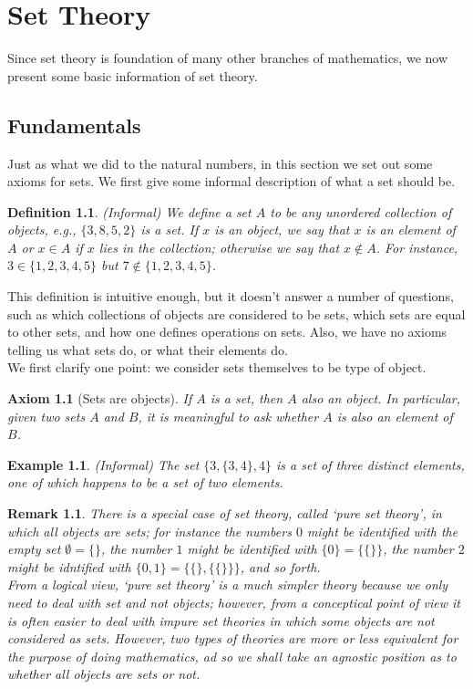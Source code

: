 \documentclass[a4paper]{book}
\newtheorem{definition}{Definition}[section]
\newtheorem{axiom}{Axiom}[chapter]
\newtheorem{example}{Example}[section]
\newtheorem{remark}{Remark}[section]
\begin{document}
	\chapter{Set Theory}
	Since set theory is foundation of many other branches of mathematics, we now present some basic information of set theory.
		\section{Fundamentals}
			Just as what we did to the natural numbers, in this section we set out some axioms for sets. We first give some informal description of what a set should be.
			\begin{definition}
				(Informal) We define a set $A$ to be any unordered collection of objects, e.g., $\{3,8,5,2\}$ is a set. If $x$ is an object, we say that $x$ is an element of $A$ or $x\in A$ if $x$ lies in the collection; otherwise we say that $x\notin A$. For instance, $3\in \{1,2,3,4,5\}$ but $7\notin \{1,2,3,4,5\}$.
			\end{definition}
			This definition is intuitive enough, but it doesn't answer a number of questions, such as which collections of objects are considered to be sets, which sets are equal to other sets, and how one defines operations on sets. Also, we have no axioms telling us what sets do, or what their elements do.\\
			We first clarify one point: we consider sets themselves to be type of object.
			\begin{axiom}[Sets are objects]
				If $A$ is a set, then $A$ also an object. In particular, given two sets $A$ and $B$, it is meaningful to ask whether $A$ is also an element of $B$.
			\end{axiom}
			\begin{example}
				(Informal) The set $\{3,\{3,4\},4\}$ is a set of three distinct elements, one of which happens to be a set of two elements.
			\end{example}
			\begin{remark}
				There is a special case of set theory, called `pure set theory', in which \textit{all} objects are sets; for instance the numbers $0$ might be identified with the empty set $\emptyset=\{\}$, the number $1$ might be identified with $\{0\}=\{\{\}\}$, the number $2$ might be idntified with $\{0,1\}=\{\{\},\{\{\}\}\}$, and so forth.\\
				From a logical view, `pure set theory' is a much simpler theory because we only need to deal with set and not objects; however, from a conceptical point of view it is often easier to deal with impure set theories in which some objects are not considered as sets. However, two types of theories are more or less equivalent for the purpose of doing mathematics, ad so we shall take an agnostic position as to whether all objects are sets or not.
			\end{remark}
\end{document}
